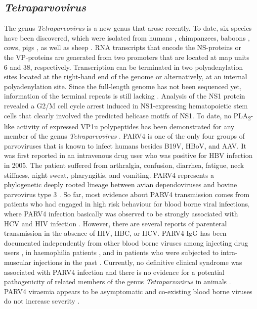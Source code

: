 \subsection{\textit{Tetraparvovirus}}
The genus \textit{Tetraparvovirus} is a new genus that arose recently. To date, six species have been discovered, which were isolated from humans \cite{pmid15956568}, chimpanzees, baboons \cite{pmid20668071}, cows, pigs \cite{pmid18632954, pmid20653980, pmid22247522}, as well as sheep \cite{pmid21980506}. RNA transcripts that encode the NS-proteins or the VP-proteins are generated from two promoters that are located at map units 6 and 38, respectively. Transcription can be terminated in two polyadenylation sites located at the right-hand end of the genome or alternatively, at an internal polyadenylation site. Since the full-length genome has not been sequenced yet, information of the terminal repeats is still lacking \cite{pmid22044541}. Analysis of the NS1 protein revealed a G2/M cell cycle arrest induced in NS1-expressing hematopoietic stem cells that clearly involved the predicted helicase motifs \cite{pmid8106366, pmid9261429, pmid7966641} of NS1. To date, no PLA\textsubscript{2}-like activity of expressed VP1u polypeptides has been demonstrated for any member of the genus \textit{Tetraparvovirus} \cite{pmid22044541}. PARV4 is one of the only four groups of parvoviruses that is known to infect humans besides B19V, HBoV, and AAV. It was first reported in an intravenous drug user who was positive for HBV infection in 2005. The patient suffered from arthralgia, confusion, diarrhea, fatigue, neck stiffness, night sweat, pharyngitis, and vomiting. PARV4 represents a phylogenetic deeply rooted lineage between avian dependoviruses and bovine parvovirus type 3 \cite{pmid15956568}. So far, most evidence about PARV4 transmission comes from patients who had engaged in high risk behaviour for blood borne viral infections, where PARV4 infection basically was observed to be strongly associated with HCV and HIV infection \cite{pmid22492853, pmid22235298, pmid17397006}. However, there are several reports of parenteral transmission in the absence of HIV, HBC, or HCV. PARV4 IgG has been documented independently from other blood borne viruses among injecting drug users \cite{pmid23283958}, in haemophilia patients \cite{pmid22043925}, and in patients who were subjected to intra-muscular injections in the past \cite{pmid22469425}. Currently, no definitive clinical syndrome was associated with PARV4 infection and there is no evidence for a potential pathogenicity of related members of the genus \textit{Tetraparvovirus} in animals \cite{pmid18632954}. PARV4 viraemia appears to be asymptomatic \cite{pmid20587191} and co-existing blood borne viruses do not increase severity \cite{pmid22235298}.   

